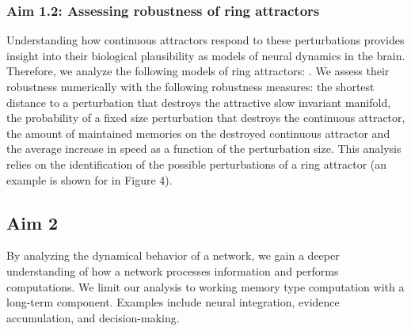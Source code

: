 \documentclass[12pt,letterpaper, onecolumn]{article}
\theoremstyle{definition}
\theoremstyle{remark}
\begin{document}



\subsubsection*{Aim 1.2: Assessing robustness of ring attractors}
Understanding how continuous attractors respond to these perturbations provides insight into their biological plausibility as models of neural dynamics in the brain.
Therefore, we analyze the following models of ring attractors: \citep{pollock2020, barak2021mapping, beiran2021, noorman2022}.
We assess their robustness numerically with the following robustness measures:
the shortest distance to a perturbation that destroys the attractive slow invariant manifold,
the probability of a fixed size perturbation that destroys the continuous attractor,
the amount of maintained memories on the destroyed continuous attractor and
the average increase in speed as a function of the perturbation size.
This analysis relies on the identification of the possible perturbations of a ring attractor (an example is shown for \citep{noorman2022} in Figure 4).










\newpage

\subsection*{Aim 2}
By analyzing the dynamical behavior of a network, we gain a deeper understanding of how a network processes information and performs computations.
 We limit our analysis to working memory type computation with a long-term component. Examples include  neural integration, evidence accumulation, and decision-making.
\end{document}
